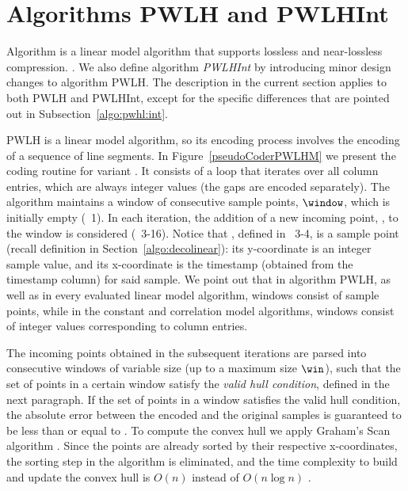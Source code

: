 

\section{Algorithms PWLH and PWLHInt}
\label{algo:pwlh}
\newcommand{\EncodeWindow}{EncodeWindow}


Algorithm \textit{\PWLHfull} \cite{coder:pwlh} is a linear model algorithm that supports lossless and near-lossless compression. \WindowParam {}. We also define algorithm \textit{PWLHInt} by introducing minor design changes to algorithm PWLH. The description in the current section applies to both PWLH and PWLHInt, except for the specific differences that are pointed out in Subsection~\ref{algo:pwhl:int}.


PWLH is a linear model algorithm, so its encoding process involves the encoding of a sequence of line segments. In Figure~\ref{pseudoCoderPWLHM} we present the coding routine for variant \maskalgo. It consists of a loop that iterates over all column entries, which are always integer values (the gaps are encoded separately). The algorithm maintains a window of consecutive sample points, $\window$, which is initially empty (\Line~1). In each iteration, the addition of a new incoming point, \incoming, to the window is considered (\Lines~3-16). Notice that \incoming, defined in \Lines~3-4, is a sample point (recall definition in Section~\ref{algo:decolinear}): its y-coordinate is an integer sample value, and its x-coordinate is the timestamp (obtained from the timestamp column) for said sample. We point out that in algorithm PWLH, as well as in every evaluated linear model algorithm, windows consist of sample points, while in the constant and correlation model algorithms, windows consist of integer values corresponding to column entries.


\clearpage





The incoming points obtained in the subsequent iterations are parsed into consecutive windows of variable size (up to a maximum size $\win$), such that the set of points in a certain window satisfy the \textit{valid hull condition}, defined in the next paragraph. If the set of points in a window satisfies the valid hull condition, the absolute error between the encoded and the original samples is guaranteed to be less than or equal to \maxerror. To compute the convex hull we apply Graham's Scan algorithm \cite{GrahamAlgo}. Since the points are already sorted by their respective x-coordinates, the sorting step in the algorithm is eliminated, and the time complexity to build and update the convex hull is $O(n)$ instead of $O(n \log n)$ \cite{AnEva2013}.


